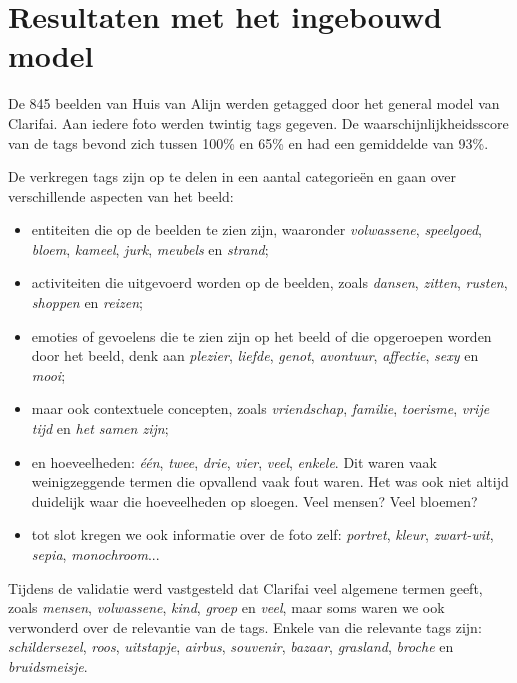 \chapter{Resultaten met het ingebouwd model}
\label{ch:resultaten-ingebouwd-model}

De 845 beelden van Huis van Alijn werden getagged door het general model van Clarifai. Aan iedere foto werden twintig tags gegeven. De waarschijnlijkheidsscore van de tags bevond zich tussen 100\% en 65\% en had een gemiddelde van 93\%. 

De verkregen tags zijn op te delen in een aantal categorieën en gaan over verschillende aspecten van het beeld:
\begin{itemize}
	\item entiteiten die op de beelden te zien zijn, waaronder \textit{volwassene}, \textit{speelgoed}, \textit{bloem}, \textit{kameel}, \textit{jurk}, \textit{meubels} en \textit{strand};
	\item activiteiten die uitgevoerd worden op de beelden, zoals \textit{dansen}, \textit{zitten}, \textit{rusten}, \textit{shoppen} en \textit{reizen};
	\item emoties of gevoelens die te zien zijn op het beeld of die opgeroepen worden door het beeld, denk aan \textit{plezier}, \textit{liefde}, \textit{genot}, \textit{avontuur}, \textit{affectie}, \textit{sexy} en \textit{mooi};
	\item maar ook contextuele concepten, zoals \textit{vriendschap}, \textit{familie}, \textit{toerisme}, \textit{vrije tijd} en \textit{het samen zijn};
	\item en hoeveelheden: \textit{één}, \textit{twee}, \textit{drie}, \textit{vier}, \textit{veel}, \textit{enkele}. Dit waren vaak weinigzeggende termen die opvallend vaak fout waren. Het was ook niet altijd duidelijk waar die hoeveelheden op sloegen. Veel mensen? Veel bloemen?
	\item tot slot kregen we ook informatie over de foto zelf: \textit{portret}, \textit{kleur}, \textit{zwart-wit}, \textit{sepia}, \textit{monochroom}...
\end{itemize}

Tijdens de validatie werd vastgesteld dat Clarifai veel algemene termen geeft, zoals \textit{mensen}, \textit{volwassene}, \textit{kind}, \textit{groep} en \textit{veel}, maar soms waren we ook verwonderd over de relevantie van de tags. Enkele van die relevante tags zijn: \textit{schildersezel}, \textit{roos}, \textit{uitstapje}, \textit{airbus}, \textit{souvenir}, \textit{bazaar}, \textit{grasland}, \textit{broche} en \textit{bruidsmeisje}. 

